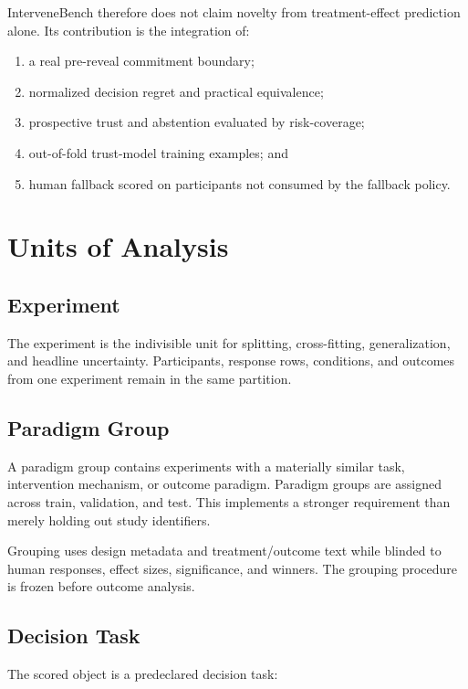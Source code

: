 \documentclass[11pt]{article}
\begin{document}
InterveneBench therefore does not claim novelty from treatment-effect prediction alone. Its contribution is the integration of:

\begin{enumerate}
\item a real pre-reveal commitment boundary;
\item normalized decision regret and practical equivalence;
\item prospective trust and abstention evaluated by risk-coverage;
\item out-of-fold trust-model training examples; and
\item human fallback scored on participants not consumed by the fallback policy.
\end{enumerate}

\section{Units of Analysis}

\subsection{Experiment}

The experiment is the indivisible unit for splitting, cross-fitting, generalization, and headline uncertainty. Participants, response rows, conditions, and outcomes from one experiment remain in the same partition.

\subsection{Paradigm Group}

A paradigm group contains experiments with a materially similar task, intervention mechanism, or outcome paradigm. Paradigm groups are assigned across train, validation, and test. This implements a stronger requirement than merely holding out study identifiers.

Grouping uses design metadata and treatment/outcome text while blinded to human responses, effect sizes, significance, and winners. The grouping procedure is frozen before outcome analysis.

\subsection{Decision Task}

The scored object is a predeclared decision task:
\end{document}
